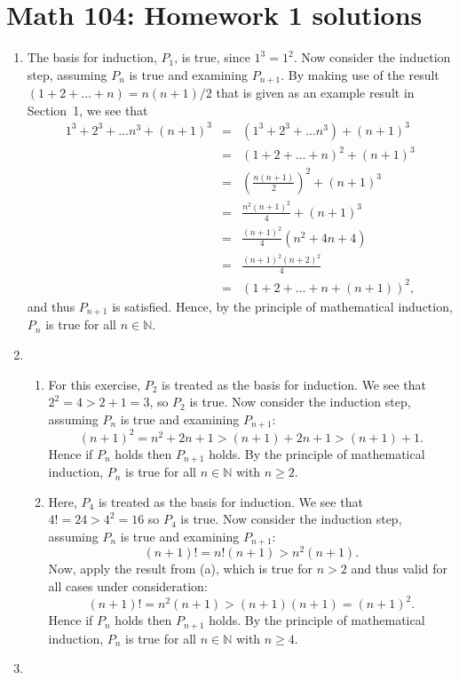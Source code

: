\documentclass[12pt]{article}
\newcommand{\N}{\mathbb{N}}
\begin{document}
\section*{Math 104: Homework 1 solutions}
\begin{enumerate}
  \item The basis for induction, $P_1$, is true, since $1^3=1^2$. Now consider
    the induction step, assuming $P_n$ is true and examining $P_{n+1}$. By
    making use of the result $(1+2+\ldots+n) = n(n+1)/2$ that is given as an
    example result in Section~1, we see that
    \begin{eqnarray*}
      1^3 + 2^3 + \ldots n^3 + (n+1)^3 &=& (1^3 + 2^3 + \ldots n^3) + (n+1)^3 \\
      &=& (1+2+ \ldots + n)^2 + (n+1)^3 \\
      &=& \left(\frac{n(n+1)}{2}\right)^2 + (n+1)^3 \\
      &=& \frac{n^2(n+1)^2}{4} + (n+1)^3 \\
      &=& \frac{(n+1)^2}{4} \left( n^2 + 4n+4 \right) \\
      &=& \frac{(n+1)^2(n+2)^2}{4} \\
      &=& (1+2+\ldots + n + (n+1))^2,
    \end{eqnarray*}
    and thus $P_{n+1}$ is satisfied. Hence, by the principle of mathematical
    induction, $P_n$ is true for all $n\in \N$.
  \item
    \begin{enumerate}
      \item For this exercise, $P_2$ is treated as the basis for induction. We
	see that $2^2 = 4 > 2+1=3$, so $P_2$ is true. Now consider the
	induction step, assuming $P_n$ is true and examining $P_{n+1}$:
	\[
	(n+1)^2 = n^2+2n+1 >(n+1)+ 2n+1 > (n+1) +1.
	\]
	Hence if $P_n$ holds then $P_{n+1}$ holds. By the principle of
	mathematical induction, $P_n$ is true for all $n\in \N$ with $n \ge 2$.
      \item Here, $P_4$ is treated as the basis for induction. We see that $4!
	= 24 > 4^2=16$ so $P_4$ is true. Now consider the induction step,
	assuming $P_n$ is true and examining $P_{n+1}$:
	\[
	(n+1)! = n! (n+1) > n^2 (n+1).
	\]
	Now, apply the result from (a), which is true for $n>2$ and thus valid
	for all cases under consideration:
	\[
	(n+1)! = n^2 (n+1) > (n+1)(n+1) = (n+1)^2.
	\]
	Hence if $P_n$ holds then $P_{n+1}$ holds. By the principle of
	mathematical induction, $P_n$ is true for all $n\in \N$ with $n \ge 4$.
    \end{enumerate}
  \item 

\end{enumerate}
\end{document}
